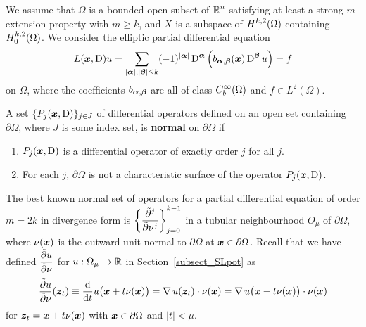 We assume that $\Omega$ is a bounded open
subset of $\DS \RR^n$ satisfying at least a strong
$m$-extension property with $m\geq k$, and $X$ is a subspace of
$\DS H^{k,2}(\Omega)$ containing
$\DS H^{k,2}_0(\Omega)$.  We consider the elliptic partial 
differential equation
\[
L(\VEC{x}, \diff)u = \sum_{|\VEC{\alpha}|,|\VEC{\beta}|\leq k}
(-1)^{|\VEC{\alpha}|} \diff^{\VEC{\alpha}}
\left( b_{\VEC{\alpha},\VEC{\beta}}(\VEC{x}) \diff^{\VEC{\beta}} u\right) = f
\]
on $\Omega$, where the coefficients $b_{\VEC{\alpha},\VEC{\beta}}$ are
all of class $\DS C^\infty_b(\Omega)$ and $f\in L^2(\Omega)$.

\begin{defn}
A set $\{P_j(\VEC{x},\diff) \}_{j\in J}$ of differential operators defined
on an open set containing $\partial \Omega$, where $J$ is some index set, is
{\bfseries normal} on
$\partial \Omega$ if
\begin{enumerate}
\item $P_j(\VEC{x},\diff)$ is a differential operator of exactly order $j$
for all $j$. 
\item For each $j$, $\partial \Omega$ is not a characteristic surface
of the operator $P_j(\VEC{x},\diff)$.
\end{enumerate}
\end{defn}

The best known normal set of operators for a partial differential
equation of order $m=2k$ in divergence form is
$\DS \left\{ \pdydxnS{}{\nu}{j} \right\}_{j=0}^{k-1}$
in a tubular neighbourhood $O_\mu$ of $\partial \Omega$,
where $\nu(\VEC{x})$ is the outward unit normal to
$\partial \Omega$ at $\VEC{x}\in \partial \Omega$.
Recall that we have defined $\DS \pdydxS{u}{\nu}$
for $u:\Omega_\mu \to \RR$ in Section~\ref{subsect_SLpot} as
\[
\pdydxS{u}{\nu}(\VEC{z}_t)
\equiv \dfdx{u\big(\VEC{x}+t\nu(\VEC{x})\big)}{t}
= \graD u(\VEC{z}_t) \cdot \nu(\VEC{x})
= \graD u\big(\VEC{x}+t\nu(\VEC{x})\big) \cdot \nu(\VEC{x})
\]
for $\VEC{z}_t = \VEC{x} + t\nu(\VEC{x})$ with $\VEC{x} \in \partial \Omega$
and $|t|< \mu$.

